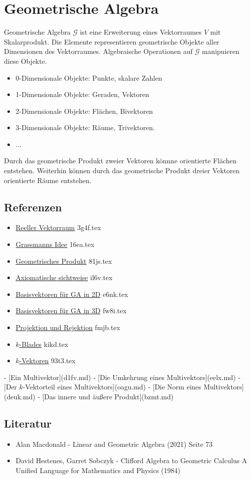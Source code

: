 \documentclass{sajzk}
\begin{document}
\section{Geometrische Algebra}
\label{f35d}

Geometrische Algebra $\mathscr{G}$ ist eine Erweiterung eines Vektorraumes $V$
mit Skalarprodukt. Die Elemente representieren geometrische Objekte aller
Dimensionen des Vektorraumes. Algebraische Operationen auf $\mathscr{G}$
manipuieren diese Objekte.

\begin{itemize}
    \item 0-Dimensionale Objekte: Punkte, skalare Zahlen
    \item 1-Dimensionale Objekte: Geraden, Vektoren
    \item 2-Dimensionale Objekte: Flächen, Bivektoren
    \item 3-Dimensionale Objekte: Räume, Trivektoren.
    \item ...
\end{itemize}

Durch das geometrische Produkt zweier Vektoren könnne orientierte Flächen
entstehen. Weiterhin können durch das geometrische Produkt dreier Vektoren
orientierte Räume entstehen.

\subsection{Referenzen}
\begin{itemize}
    \item \href{3g4f.pdf}{Reeller Vektorraum} 3g4f.tex
    \item \href{16ea.pdf}{Grassmanns Idee} 16ea.tex
    \item \href{81js.pdf}{Geometrisches Produkt} 81js.tex
    \item \href{il6v.pdf}{Axiomatische sichtweise} il6v.tex
    \item \href{e6nk.pdf}{Basisvektoren für GA in 2D} e6nk.tex
    \item \href{fw8i.pdf}{Basisvektoren für GA in 3D} fw8i.tex
    \item \href{fmjb.pdf}{Projektion und Rejektion} fmjb.tex
    \item \href{kikd.pdf}{$k$-Blades} kikd.tex
    \item \href{93t3.pdf}{$k$-Vektoren} 93t3.tex
\end{itemize}

- [Ein Multivektor](d1fv.md)
- [Die Umkehrung eines Multivektors](eelx.md)
- [Der $k$-Vektorteil eines Multivektors](oagu.md)
- [Die Norm eines Multivektors](deuk.md)
- [Das innere und äußere Produkt](bzmt.md)

\subsection{Literatur}
\begin{itemize}
    \item Alan Macdonald - Linear and Geometric Algebra (2021) Seite 73
    \item David Hestenes, Garret Sobczyk - Clifford Algebra to Geometric Calculus A Unified Language for Mathematics and Physics (1984)
\end{itemize}
\end{document}
